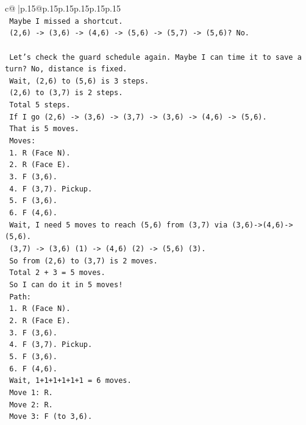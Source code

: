 \documentclass{article}
\begin{document}
{\begin{supertabular}{c@{$\;$}|p{.15\linewidth}@{}p{.15\linewidth}p{.15\linewidth}p{.15\linewidth}p{.15\linewidth}p{.15\linewidth}}
{{{\\ 
\texttt{   Maybe I missed a shortcut.} \\
\texttt{   (2,6) {-}> (3,6) {-}> (4,6) {-}> (5,6) {-}> (5,7) {-}> (5,6)? No.} \\
\\ 
\texttt{   Let's check the guard schedule again. Maybe I can time it to save a turn? No, distance is fixed.} \\
\texttt{   Wait, (2,6) to (5,6) is 3 steps.} \\
\texttt{   (2,6) to (3,7) is 2 steps.} \\
\texttt{   Total 5 steps.} \\
\texttt{   If I go (2,6) {-}> (3,6) {-}> (3,7) {-}> (3,6) {-}> (4,6) {-}> (5,6).} \\
\texttt{   That is 5 moves.} \\
\texttt{   Moves:} \\
\texttt{   1. R (Face N).} \\
\texttt{   2. R (Face E).} \\
\texttt{   3. F (3,6).} \\
\texttt{   4. F (3,7). Pickup.} \\
\texttt{   5. F (3,6).} \\
\texttt{   6. F (4,6).} \\
\texttt{   Wait, I need 5 moves to reach (5,6) from (3,7) via (3,6){-}>(4,6){-}>(5,6).} \\
\texttt{   (3,7) {-}> (3,6) (1) {-}> (4,6) (2) {-}> (5,6) (3).} \\
\texttt{   So from (2,6) to (3,7) is 2 moves.} \\
\texttt{   Total 2 + 3 = 5 moves.} \\
\texttt{   So I can do it in 5 moves!} \\
\texttt{   Path:} \\
\texttt{   1. R (Face N).} \\
\texttt{   2. R (Face E).} \\
\texttt{   3. F (3,6).} \\
\texttt{   4. F (3,7). Pickup.} \\
\texttt{   5. F (3,6).} \\
\texttt{   6. F (4,6).} \\
\texttt{   Wait, 1+1+1+1+1+1 = 6 moves.} \\
\texttt{   Move 1: R.} \\
\texttt{   Move 2: R.} \\
\texttt{   Move 3: F (to 3,6).} \\
}}}
\end{supertabular}}
\end{document}
